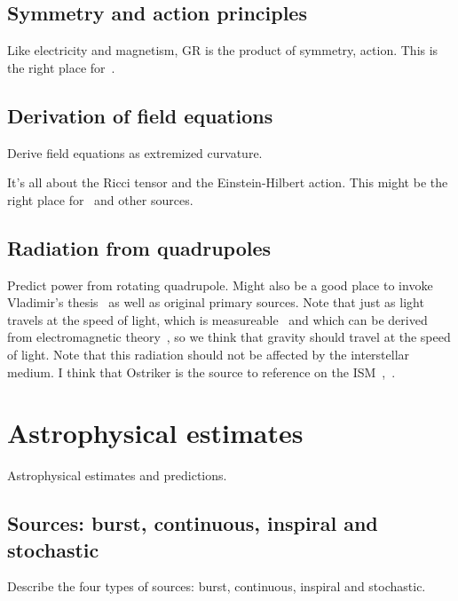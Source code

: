         \subsection{Symmetry and action principles}
        \label{principles}

            Like electricity and magnetism, GR is the product of symmetry, action. This is the right place for~\cite{Carroll1997}.

        \subsection{Derivation of field equations}
        \label{field_equations}

            Derive field equations as extremized curvature.

		It's all about the Ricci tensor and the Einstein-Hilbert action. This might be the right place for~\cite{Farr2010} and other sources.

        \subsection{Radiation from quadrupoles}
        \label{radiation}
  
            Predict power from rotating quadrupole. Might also be a good place to invoke Vladimir's thesis~\cite{DergachevThesis} as well as original primary sources. Note that just as light travels at the speed of light, which is measureable~\cite{CODATA} and which can be derived from electromagnetic theory~\cite{GriffithsE}, so we think that gravity should travel at the speed of light. Note that this radiation should not be affected by the interstellar medium. I think that Ostriker is the source to reference on the ISM~\cite{Caldwell1981},~\cite{McKee1977}.

    \section{Astrophysical estimates}
    \label{estimates}

        Astrophysical estimates and predictions.

        \subsection{Sources: burst, continuous, inspiral and stochastic}
        \label{source_types}

            Describe the four types of sources: burst, continuous, inspiral and stochastic.

